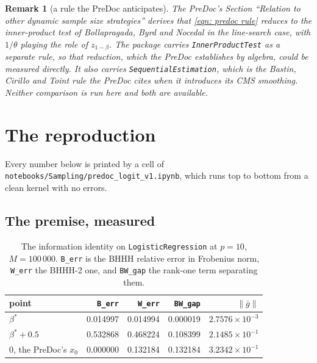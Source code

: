 \documentclass[11pt,a4paper]{article}
\providecommand{\norm}[1]{\left \lVert #1 \right \rVert}
\newtheorem{remark}{Remark}
\begin{document}
\begin{remark}[a rule the PreDoc anticipates]
The PreDoc's Section ``Relation to other dynamic sample size strategies'' derives
that \eqref{eqn: predoc rule} reduces to the inner-product test of Bollapragada,
Byrd and Nocedal in the line-search case, with $1/\theta$ playing the role of
$z_{1-\beta}$. The package carries \texttt{InnerProductTest} as a separate rule,
so that reduction, which the PreDoc establishes by algebra, could be measured
directly. It also carries \texttt{SequentialEstimation}, which is the Bastin,
Cirillo and Toint rule the PreDoc cites when it introduces its CMS smoothing.
Neither comparison is run here and both are available.
\end{remark}

\section{The reproduction}\label{sec: reproduction}

Every number below is printed by a cell of
\texttt{notebooks/Sampling/predoc\_logit\_v1.ipynb}, which runs top to bottom
from a clean kernel with no errors.

\subsection{The premise, measured}

\begin{table}[H]
  \centering\small
  \caption{The information identity on \texttt{LogisticRegression} at $p = 10$,
    $M = 100\,000$. \texttt{B\_err} is the BHHH relative error in Frobenius norm,
    \texttt{W\_err} the BHHH-2 one, and \texttt{BW\_gap} the rank-one term
    separating them.}
  \label{tab: identity}
  \begin{tabular}{lrrrr}
    \toprule
    point & \texttt{B\_err} & \texttt{W\_err} & \texttt{BW\_gap} & $\norm{\bar g}$ \\
    \midrule
    $\beta^\ast$              & 0.014997 & 0.014994 & 0.000019 & $2.7576\times10^{-3}$ \\
    $\beta^\ast + 0.5$        & 0.532868 & 0.468224 & 0.108399 & $2.1485\times10^{-1}$ \\
    $0$, the PreDoc's $x_0$   & 0.000000 & 0.132184 & 0.132184 & $3.2342\times10^{-1}$ \\
    \bottomrule
  \end{tabular}
\end{table}
\end{document}
